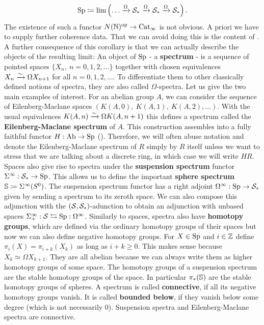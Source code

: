 \begin{equation*}
    \Sp\coloneqq \lim\left( \dots\xrightarrow{\Omega}\Spc_* \xrightarrow{\Omega} \Spc_* \xrightarrow{\Omega}\Spc_* \right).
\end{equation*}
The existence of such a functor $N(\N)^{\op}\ra \Cat_\infty$ is not obvious. 
A priori we have to supply further coherence data. That we can avoid doing this is the content of \cite[Corollary~7.3.17]{cisinski2019higher}. A further consequence of this corollary is that we can actually describe the objects of the resulting limit:
An object of $\Sp$ - a \textbf{spectrum} -  is a sequence of pointed spaces $\{X_n,\ n=0,1,2,\dots\}$ together with chosen equivalences $X_n\rai \Omega X_{n+1}$ for all $n=0,1,2,\dots$. To differentiate them to other classically defined notions of spectra, they are also called $\Omega$-spectra.
Let us give the two main examples of interest. For an abelian group $A$, we can consider the sequence of Eilenberg-Maclane spaces $\left( K(A,0),\ K(A,1),\ K(A,2),\dots \right)$. With the usual equivalences $K(A,n)\rai \Omega K(A,n+1)$ this defines a spectrum called the \textbf{Eilenberg-Maclane spectrum }of $A$. 
This construction assembles into a fully faithful functor $H:\Ab\ra \Sp$ (\cite[Example~1.3.3.5]{lurie2017higher}). Therefore, we will often abuse notation and denote the Eilenberg-Maclane spectrum of $R$ simply by $R$ itself unless we want to stress that we are talking about a discrete ring, in which case we will write $HR$. Spaces also give rise to spectra under the \textbf{suspension spectrum} functor $\Sigma^{\infty}:\Spc_*\ra \Sp$. 
This allows us to define the important \textbf{sphere spectrum} $\S\coloneqq \Sigma^{\infty}(S^0)$. The suspension spectrum functor has a right adjoint $\Omega^\infty:\Sp\to\Spc_*$ given by sending a spectrum to its zeroth space. We can also compose this adjunction with the $(\Spc,\Spc_*)$-adunction to obtain an adjunction with unbased spaces $\sip:\Spc\leftrightarrows\Sp:\Omega^\infty$.
Similarly to spaces, spectra also have \textbf{homotopy groups}, which are defined via the ordinary homotopy groups of their spaces but now we can also define negative homotopy groups. For $X\in \Sp$ and $i\in\Z$ define $\pi_i(X)=\pi_{i+k}(X_k)$ as long as $i+k\geq 0$. This makes sense because $X_k\simeq \Omega X_{k+1}$. They are all abelian because we can always write them as higher homotopy groups of some space.
The homotopy groups of a suspension spectrum are the stable homotopy groups of the space. In particular $\pi_*(\S)$ are the stable homotopy groups of spheres. A spectrum is called \textbf{connective}, if all its negative homotopy groups vanish. It is called \textbf{bounded below}, if they vanish below some degree (which is not necessarily 0). Suspension spectra and Eilenberg-Maclane spectra are connective.
